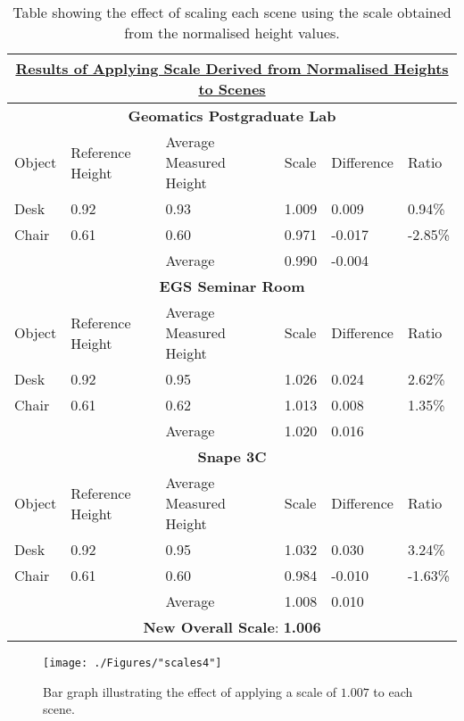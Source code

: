 \clearpage

\begin{table}[h!]
	\centering
	\begin{tabular}{|p{1.25cm}|p{2cm}|p{3.5cm}|p{1.85cm}|p{2cm}|p{1.25cm}|}
		\hline
		\multicolumn{6}{|c|}{\textbf{\underline{Results of Applying Scale Derived from Normalised Heights to Scenes}}} \\
		\hline
		\multicolumn{6}{|c|}{\textbf{Geomatics Postgraduate Lab}} \\
		\hline
		Object & Reference Height & Average Measured Height & Scale & Difference & Ratio \\
		\hline
		Desk & 0.92 & 0.93 & 1.009 & 0.009 & 0.94\% \\
		Chair & 0.61 & 0.60 & 0.971 & -0.017 & -2.85\% \\
		\hline
		& & Average & 0.990 & -0.004 &\\
		\hline
		\multicolumn{6}{|c|}{\textbf{EGS Seminar Room}} \\
		\hline
		Object & Reference Height & Average Measured Height & Scale & Difference & Ratio \\
		\hline
		Desk & 0.92 & 0.95 & 1.026 & 0.024 & 2.62\% \\
		Chair & 0.61 & 0.62 & 1.013 & 0.008 & 1.35\% \\
		\hline
		& & Average & 1.020 & 0.016 &\\
		\hline
		\multicolumn{6}{|c|}{\textbf{Snape 3C}} \\
		\hline
		Object & Reference Height & Average Measured Height & Scale & Difference & Ratio \\
		\hline
		Desk & 0.92 & 0.95 & 1.032 & 0.030 & 3.24\% \\
		Chair & 0.61 & 0.60 & 0.984 & -0.010 & -1.63\% \\
		\hline
		& & Average & 1.008 & 0.010 &\\
		\hline
		\multicolumn{6}{|c|}{\textbf{New Overall Scale}: \textbf{1.006}}\\
		\hline
	\end{tabular}
	\caption{Table showing the effect of scaling each scene using the scale obtained from the normalised height values.}
	\label{scale4}
\end{table}
\begin{figure}[h!]
	\centering
	\texttt{[image: ./Figures/"scales4"]}
	\caption[Bar graph illustrating the effect of scaling the scenes with normalised values]{Bar graph illustrating the effect of applying a scale of $1.007$ to each scene. \label{scalegraph4}}
\end{figure}

